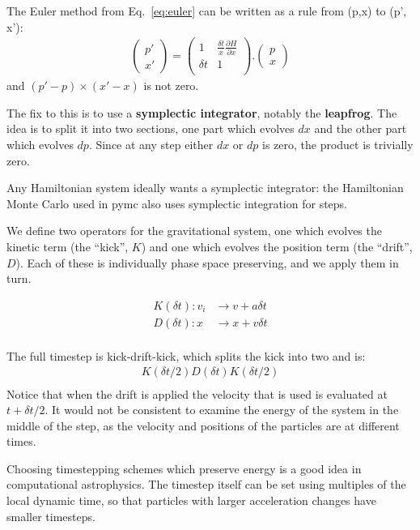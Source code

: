 \documentclass[12pt]{article}
\begin{document}
The Euler method from Eq.~\ref{eq:euler} can be written as a rule from (p,x) to (p', x'):
\begin{align}
\begin{pmatrix}
 p' \\
 x'
\end{pmatrix}
=
\begin{pmatrix}
1 & \frac{\delta t}{x} \frac{\partial H}{\partial x} \\
\delta t & 1 \\
\end{pmatrix}
.
\begin{pmatrix}
 p \\
 x
\end{pmatrix}
\end{align}
and $(p' - p)\times (x' - x)$ is not zero.

The fix to this is to use a \textbf{symplectic integrator}, notably the \textbf{leapfrog}. The idea is to split it into two sections, one part which evolves $dx$ and the other part which evolves $dp$. Since at any step either $dx$ or $dp$ is zero, the product is trivially zero.

Any Hamiltonian system ideally wants a symplectic integrator: the Hamiltonian Monte Carlo used in pymc also uses symplectic integration for steps.

We define two operators for the gravitational system, one which evolves the kinetic term (the ``kick'', $K$) and one which evolves the position term (the ``drift'', $D$). Each of these is individually phase space preserving, and we apply them in turn.

\begin{align}
 K(\delta t): v_i &\to v + a \delta t \\
 D(\delta t): x &\to x + v \delta t \\
\end{align}

The full timestep is kick-drift-kick, which splits the kick into two and is:
\begin{align}
 K(\delta t/2) D(\delta t) K(\delta t/2) \\
\end{align}
Notice that when the drift is applied the velocity that is used is evaluated at $t + \delta t /2$. It would not be consistent to examine the energy of the system in the middle of the step, as the velocity and positions of the particles are at different times.

Choosing timestepping schemes which preserve energy is a good idea in computational astrophysics. The timestep itself can be set using multiples of the local dynamic time, so that particles with larger acceleration changes have smaller timesteps.
\end{document}
